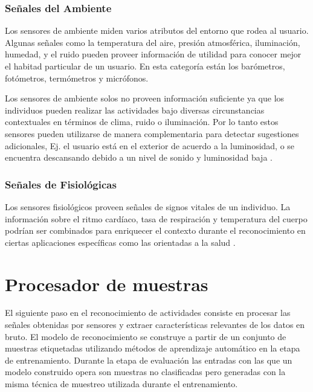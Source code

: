 \subsubsection{Señales del Ambiente}

Los sensores de ambiente miden varios atributos del entorno que rodea
al usuario. Algunas señales como la temperatura del aire, presión
atmosférica, iluminación, humedad, y el ruido pueden proveer información
de utilidad para conocer mejor el habitad particular de un usuario.
En esta categoría están los barómetros, fotómetros, termómetros y
micrófonos.

Los sensores de ambiente solos no proveen información suficiente ya
que los individuos pueden realizar las actividades bajo diversas circunstancias
contextuales en términos de clima, ruido o iluminación. Por lo tanto
estos sensores pueden utilizarse de manera complementaria para detectar
sugestiones adicionales, Ej. el usuario está en el exterior de acuerdo
a la luminosidad, o se encuentra descansando debido a un nivel de
sonido y luminosidad baja \cite{LaraLabrador2013}.

\subsubsection{Señales de Fisiológicas}

Los sensores fisiológicos proveen señales de signos vitales de un
individuo. La información sobre el ritmo cardíaco, tasa de respiración
y temperatura del cuerpo podrían ser combinados para enriquecer el
contexto durante el reconocimiento en ciertas aplicaciones específicas
como las orientadas a la salud \cite{LaraLabrador2013}.

\section{Procesador de muestras}

\label{sec44:proceso-se=0000F1ales}El siguiente paso en el reconocimiento
de actividades consiste en procesar las señales obtenidas por sensores
y extraer características relevantes de los datos en bruto. El modelo
de reconocimiento se construye a partir de un conjunto de muestras
etiquetadas utilizando métodos de aprendizaje automático en la etapa
de entrenamiento. Durante la etapa de evaluación las entradas con
las que un modelo construido opera son muestras no clasificadas pero
generadas con la misma técnica de muestreo utilizada durante el entrenamiento.

